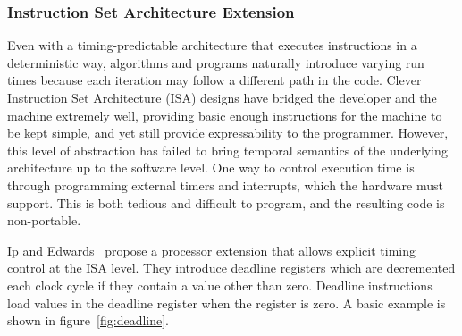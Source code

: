 \documentclass[times, 10pt,twocolumn]{article}
\begin{document}
\subsubsection {Instruction Set Architecture Extension}
Even with a timing-predictable architecture that executes instructions in a deterministic way, algorithms and programs naturally introduce varying run times because each iteration may follow a different path in the code. Clever Instruction Set Architecture (ISA) designs have bridged the developer and the machine extremely well, providing basic enough instructions for the machine to be kept simple, and yet still provide expressability to the programmer. However, this level of abstraction has failed to bring temporal semantics of the underlying architecture up to the software level. One way to control execution time is through programming external timers and interrupts, which the hardware must support. This is both tedious and difficult to program, and the resulting code is non-portable. 

Ip and Edwards~\cite{ip2006processor} propose a processor extension that allows explicit timing control at the ISA level. They introduce deadline registers which are decremented each clock cycle if they contain a value other than zero. Deadline instructions load values in the deadline register when the register is zero. A basic example is shown in figure~\ref{fig:deadline}.
\end{document}
